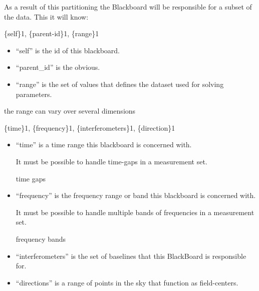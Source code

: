 \documentclass[]{lofar}
\begin{document}
      As a result of this partitioning the Blackboard will be
      responsible for a subset of the data. This it will know:

      \{self\}1, \{parent-id\}1, \{range\}1

      \begin{itemize}

        \item 

          ``self'' is the id of this blackboard.

        \item 

          ``parent\_id'' is the obvious.

        \item 

          ``range'' is the set of values that defines the dataset used
          for solving parameters.

      \end{itemize}

      the range can vary over several dimensions

      \{time\}1, \{frequency\}1, \{interferometers\}1, \{direction\}1

      \begin{itemize}

	\item 

          ``time'' is a time range this blackboard is concerned with.
          \begin{requirement}
            It must be possible to handle time-gaps in a measurement set.
            \caption{time gaps\label{req:time-gaps}}
          \end{requirement}

	\item 

          ``frequency'' is the frequency range or band this blackboard
          is concerned with.

          \begin{requirement}
            It must be possible to handle multiple bands of frequencies in a
            measurement set.
            \caption{frequency bands\label{req:frequency-bands}}
          \end{requirement}

	\item 

          ``interferometers'' is the set of baselines that this
          BlackBoard is responsible for.

	\item 

          ``directions'' is a range of points in the sky that function
          as field-centers.

      \end{itemize}
\end{document}
